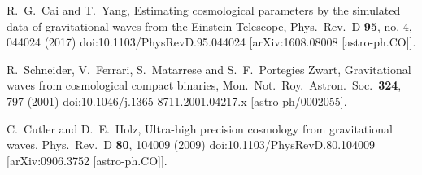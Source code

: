 \documentclass[aps,prd,nofootinbib,amsmath,amssymb,superscriptaddress,twocolumn,10pt]{revtex4}%
\begin{document}
\begin{thebibliography}{99}
  R.~G.~Cai and T.~Yang,
  Estimating cosmological parameters by the simulated data of gravitational waves from the Einstein Telescope,
  Phys.\ Rev.\ D {\bf 95}, no. 4, 044024 (2017)
  doi:10.1103/PhysRevD.95.044024
  [arXiv:1608.08008 [astro-ph.CO]].



  R.~Schneider, V.~Ferrari, S.~Matarrese and S.~F.~Portegies Zwart,
  Gravitational waves from cosmological compact binaries,
  Mon.\ Not.\ Roy.\ Astron.\ Soc.\  {\bf 324}, 797 (2001)
  doi:10.1046/j.1365-8711.2001.04217.x
  [astro-ph/0002055].

  C.~Cutler and D.~E.~Holz,
  Ultra-high precision cosmology from gravitational waves,
  Phys.\ Rev.\ D {\bf 80}, 104009 (2009)
  doi:10.1103/PhysRevD.80.104009
  [arXiv:0906.3752 [astro-ph.CO]].


\end{thebibliography}
\end{document}
